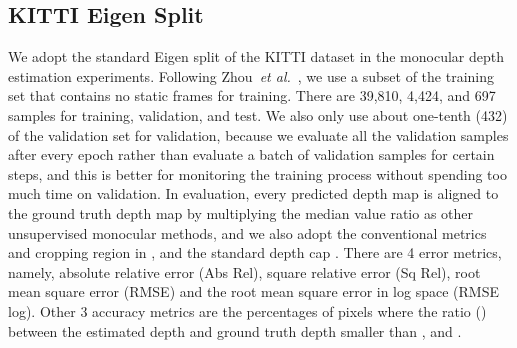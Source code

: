 \documentclass[letterpaper, 10 pt, conference]{ieeeconf}
\def\etal{\emph{et al.}}
\begin{document}
\subsection{KITTI Eigen Split}
We adopt the standard Eigen split \cite{eigen2014depth} of the KITTI dataset \cite{geiger2013vision} in the monocular depth estimation experiments. 
Following Zhou~\etal~\cite{zhou2017unsupervised}, we use a subset of the training set that contains no static frames for training. There are 39,810, 4,424, and 697 samples for training, validation, and test. 
We also only use about one-tenth (432) of the validation set for validation, because we evaluate all the validation samples after every epoch rather than evaluate a batch of validation samples for certain steps, and this is better for monitoring the training process without spending too much time on validation. 
In evaluation, every predicted depth map is aligned to the ground truth depth map by multiplying the median value ratio \cite{zhou2017unsupervised} as other unsupervised monocular methods, and we also adopt the conventional metrics and cropping region in \cite{eigen2014depth}, and the standard depth cap  \cite{godard2017unsupervised}. There are 4 error metrics, namely, absolute relative error (Abs Rel), square relative error (Sq Rel), root mean square error (RMSE) and the root mean square error in log space (RMSE log). Other 3 accuracy metrics are the percentages of pixels where the ratio () between the estimated depth and ground truth depth smaller than ,  and . 
\end{document}
